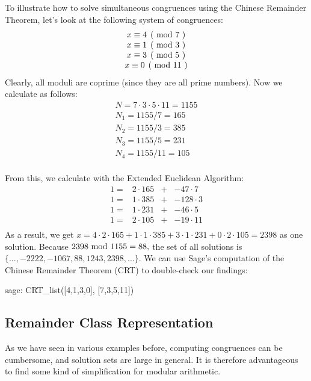 \begin{example} To illustrate how to solve simultaneous congruences using the Chinese Remainder Theorem, let's look at the following system of congruences:
$$
\begin{array}{c}
\kongru{x}{4}{7} \\
\kongru{x}{1}{3} \\
\kongru{x}{3}{5} \\
\kongru{x}{0}{11} \\
\end{array}
$$
Clearly, all moduli are coprime (since they are all prime numbers).  Now we calculate as follows: 
$$
\begin{array}{l}
N = 7 \cdot 3 \cdot 5 \cdot 11 = 1155\\
N_1 = 1155/7 = 165\\
N_2 = 1155/3 = 385\\
N_3 = 1155/5 = 231\\
N_4 = 1155/11 = 105\\
\end{array}
$$

From this, we calculate with the Extended Euclidean Algorithm:
$$
\begin{array}{cccc}
 1 = & 2 \cdot 165  & + & -47 \cdot 7 \\
 1 = & 1 \cdot 385  & + &  -128 \cdot 3 \\
 1 = & 1 \cdot 231  & + &  -46 \cdot 5 \\
 1 = & 2 \cdot 105  & + &  -19 \cdot 11 \\
\end{array}
$$
As a result, we get $x = 4 \cdot 2 \cdot 165 + 1 \cdot 1 \cdot 385 + 3 \cdot 1 \cdot 231 + 0 \cdot 2 \cdot 105 = 2398$
as one solution. Because $ 2398 \text{ mod } 1155 = 88, $ the set of all solutions is
$ \{\ldots, -2222, -1067,88,1243, 2398, \ldots \} $. We can use  Sage's computation of the Chinese Remainder Theorem (CRT) to double-check our findings:
\begin{sagecommandline}
sage: CRT_list([4,1,3,0], [7,3,5,11])
\end{sagecommandline}
\end{example}

\subsection{Remainder Class Representation}
\label{def:remainder_class_representation}
As we have seen in various examples before, computing congruences can be cumbersome, and solution sets are large in general. It is therefore advantageous to find some kind of simplification for modular arithmetic.

